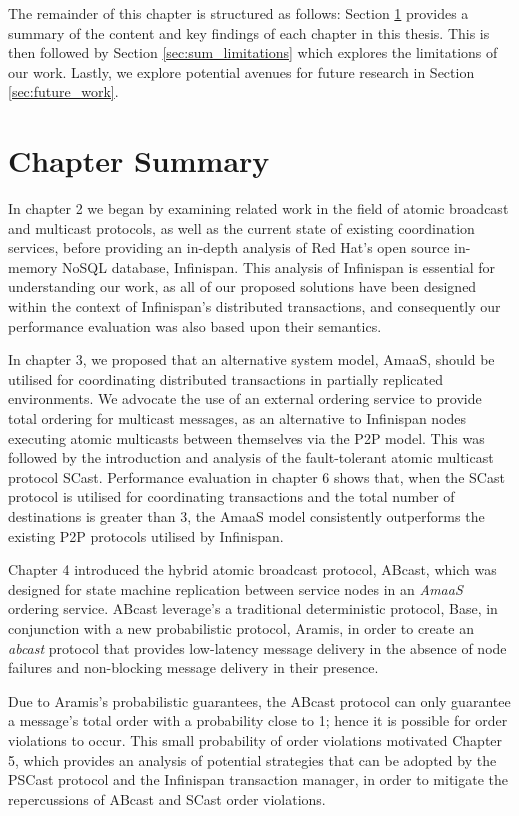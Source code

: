 The remainder of this chapter is structured as follows: Section \ref{sec:chapter_summary} provides a summary of the content and key findings of each chapter in this thesis.  This is then followed by Section \ref{sec:sum_limitations} which explores the limitations of our work.  Lastly, we explore potential avenues for future research in Section \ref{sec:future_work}.  


\section{Chapter Summary}\label{sec:chapter_summary}
In chapter 2 we began by examining related work in the field of atomic broadcast and multicast protocols, as well as the current state of existing coordination services, before providing an in-depth analysis of Red Hat's open source in-memory NoSQL database, Infinispan.  This analysis of Infinispan is essential for understanding our work, as all of our proposed solutions have been designed within the context of Infinispan's distributed transactions, and consequently our performance evaluation was also based upon their semantics.

In chapter 3, we proposed that an alternative system model, \textsf{AmaaS}, should be utilised for coordinating distributed transactions in partially replicated environments.  We advocate the use of an external ordering service to provide total ordering for multicast messages, as an alternative to Infinispan nodes executing atomic multicasts between themselves via the P2P model.  This was followed by the introduction and analysis of the fault-tolerant atomic multicast protocol \textsf{SCast}.  Performance evaluation in chapter 6 shows that, when the \textsf{SCast} protocol is utilised for coordinating transactions and the total number of destinations is greater than 3, the \textsf{AmaaS} model consistently outperforms the existing P2P protocols utilised by Infinispan.

Chapter 4 introduced the hybrid atomic broadcast protocol, \textsf{ABcast}, which was designed for state machine replication between service nodes in an \emph{AmaaS} ordering service.  \textsf{ABcast} leverage's a traditional deterministic protocol, \textsf{Base}, in conjunction with a new probabilistic protocol, \textsf{Aramis}, in order to create an \emph{abcast} protocol that provides low-latency message delivery in the absence of node failures and non-blocking message delivery in their presence.  

Due to \textsf{Aramis}'s probabilistic guarantees, the \textsf{ABcast} protocol can only guarantee a message's total order with a probability close to 1; hence it is possible for order violations to occur.  This small probability of order violations motivated Chapter 5, which provides an analysis of potential strategies that can be adopted by the \textsf{PSCast} protocol and the Infinispan transaction manager, in order to mitigate the repercussions of \textsf{ABcast} and SCast order violations.  

